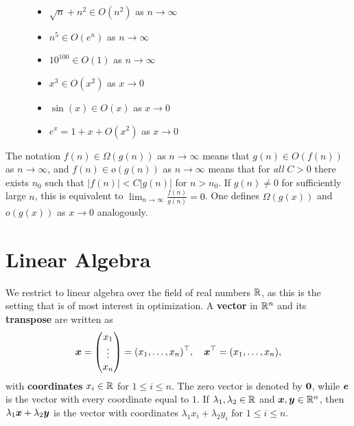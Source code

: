 \begin{figure}[h!]
\begin{minipage}{0.45\textwidth}
 \begin{itemize}
 \item $\sqrt{n}+n^2\in O(n^2)$ as $n\to \infty$
 \item $n^5\in O(e^{n})$ as $n\to \infty$
 \item $10^{100}\in O(1)$ as $n\to \infty$
 \end{itemize}
\end{minipage}
%
\begin{minipage}{0.45\textwidth}
  \begin{itemize}
 \item $x^3\in O(x^2)$ as $x\to 0$
 \item $\sin(x) \in O(x)$ as $x\to 0$
 \item $e^x = 1+x+O(x^2)$ as $x\to 0$
 \end{itemize}
\end{minipage}
\end{figure}

The notation $f(n)\in \Omega(g(n))$ as $n\to \infty$ means that $g(n)\in O(f(n))$ as $n\to \infty$, and $f(n)\in o(g(n))$ as $n\to \infty$ means that for {\em all} $C>0$ there exists $n_0$ such that $|f(n)|<C|g(n)|$ for $n>n_0$. If $g(n)\neq 0$ for sufficiently large $n$, this is equivalent to $\lim_{n\to \infty}\frac{f(n)}{g(n)} = 0$. One defines $\Omega(g(x))$ and $o(g(x))$  as $x\to 0$ analogously.

\section{Linear Algebra}
We restrict to linear algebra over the field of real numbers $\mathbb{R}$, as this is the setting that is of most interest in optimization. A \textbf{vector} in $\mathbb{R}^n$ and its \textbf{transpose} are written as
\begin{equation*}
  \bm{x} = \begin{pmatrix} x_{1}\\
                    \vdots\\
                    x_{n}
\end{pmatrix} = (x_1,\dots,x_n)^{\top}, \quad 
  \bm{x}^\top = (x_{1}, \dots, x_{n}),
\end{equation*}
with \textbf{coordinates} $x_i\in \mathbb{R}$ for $1\leq i\leq n$. The zero vector is denoted by $\bm{0}$, while $\bm{e}$ is the vector with every coordinate equal to $1$. If $\lambda_1,\lambda_2\in \mathbb{R}$ and $\bm{x},\bm{y}\in \mathbb{R}^n$, then $\lambda_1 \bm{x}+\lambda_2\bm{y}$ is the vector with coordinates $\lambda_1x_i+\lambda_2y_i$ for $1\leq i\leq n$.

